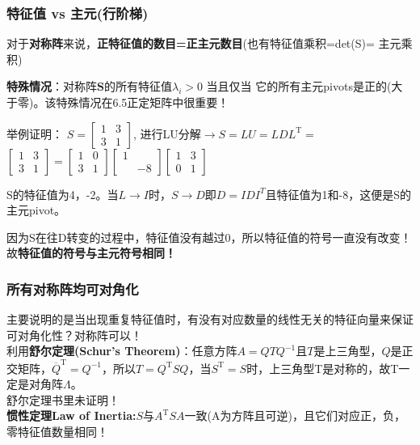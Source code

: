     \subsubsection{特征值 vs 主元(行阶梯)}
    对于\textbf{对称阵}来说，\textbf{正特征值的数目=正主元数目}(也有特征值乘积=det(S)= 主元乘积)

    \textbf{特殊情况}：对称阵$\bm{S}$的所有特征值$\lambda_i > 0$ 当且仅当 它的所有主元pivots是正的(大于零)。该特殊情况在6.5正定矩阵中很重要！

    举例证明：
    $S = \left[\begin{array}{ll}{1} & {3} \\ {3} & {1}\end{array}\right]$, 进行LU分解$\rightarrow S=LU=L D L^{\mathrm{T}}=$$\left[\begin{array}{ll}{1} & {3} \\ {3} & {1}\end{array}\right]=\left[\begin{array}{ll}{1} & {0} \\ {3} & {1}\end{array}\right]\left[\begin{array}{ll}{1} \\ {} & {-8}\end{array}\right]\left[\begin{array}{ll}{1} & {3} \\ {0} & {1}\end{array}\right]$

    S的特征值为4，-2。当$L \rightarrow I$时，$S \rightarrow D$即$D = IDI^{T}$且特征值为1和-8，这便是S的主元pivot。

    因为S在往D转变的过程中，特征值没有越过0，所以特征值的符号一直没有改变！故\textbf{特征值的符号与主元符号相同！}

    \subsubsection{所有对称阵均可对角化}
    主要说明的是当出现重复特征值时，有没有对应数量的线性无关的特征向量来保证可对角化性？对称阵可以！
    \\
    利用\textbf{舒尔定理(Schur's Theorem)}：任意方阵$A=Q T Q^{-1}$且$T$是上三角型，$Q$是正交矩阵，$\overline{Q}^{\mathrm{T}}=Q^{-1}$，所以$T=Q^{\mathrm{T}} S Q$，当$S^{\mathrm{T}}=S$时，上三角型T是对称的，故T一定是对角阵$\Lambda$。
    \\
    舒尔定理书里未证明！\\
    \textbf{惯性定理Law of Inertia:}\quad $S$与$A^{\mathrm{T}} S A$一致(A为方阵且可逆)，且它们对应正，负，零特征值数量相同！

